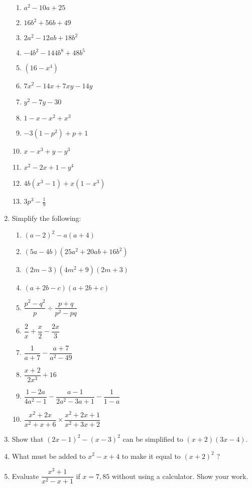 \begin{eocexercises}{}
\begin{enumerate}[itemsep=5pt, label=\textbf{\arabic*}. ]
\begin{multicols}{2}
\begin{enumerate}[itemsep=5pt, label=\textbf{(\alph*)} ]
\item ${a}^{2}-10a+25$
\item $16{b}^{2}+56b+49$
\item $2{a}^{2}-12ab+18{b}^{2}$
\item $-4{b}^{2}-144{b}^{8}+48{b}^{5}$
\item $(16-{x}^{4})$
\item ${7x}^{2}-14x+7xy-14y$
\item ${y}^{2}-7y-30$
\item $1-x-{x}^{2}+{x}^{3}$
\item $-3(1-{p}^{2})+p+1$
\item $x-x^{3} + y - y^{3}$
\item $x^{2} - 2x + 1 - y^{4}$
\item $4b(x^{3} - 1) + x(1-x^{3})$
\item $3p^{3} - \frac{1}{9}$
\end{enumerate}
\end{multicols}
\item Simplify the following:
\begin{multicols}{2}
\begin{enumerate}[itemsep=5pt, label=\textbf{(\alph*)} ] 
\item ${(a-2)}^{2}-a(a+4)$
\item $(5a-4b)(25{a}^{2}+20ab+16{b}^{2})$
\item $(2m-3)(4{m}^{2}+9)(2m+3)$
\item $(a+2b-c)(a+2b+c)$
\item $\dfrac{{p}^{2}-{q}^{2}}{p}÷\dfrac{p+q}{{p}^{2}-pq}$
\item $\dfrac{2}{x}+\dfrac{x}{2}-\dfrac{2x}{3}$
\item $\dfrac{1}{a+7}-\dfrac{a+7}{a^{2}-49}$
\item $\dfrac{x+2}{2x^{3}} + 16$
\item $\dfrac{1-2a}{4a^{2} -1} - \dfrac{a-1}{2a^{2}-3a+1} - \dfrac{1}{1-a}$
\item $\dfrac{x^{2} + 2x}{x^{2}+ x + 6} \times \dfrac{x^{2} + 2x + 1}{x^{2} + 3x +2}$
\end{enumerate}
\end{multicols}
\item Show that ${(2x-1)}^{2}-{(x-3)}^{2}$ can be simplified to $(x+2)(3x-4)$.
\item What must be added to ${x}^{2}-x+4$ to make it equal to ${(x+2)}^{2}$ ?
\item Evaluate $\dfrac{x^{3}+1}{x^{2}-x+1}$ if $x=7,85$ without using a calculator. Show your work.
\end{enumerate}

\end{eocexercises}

